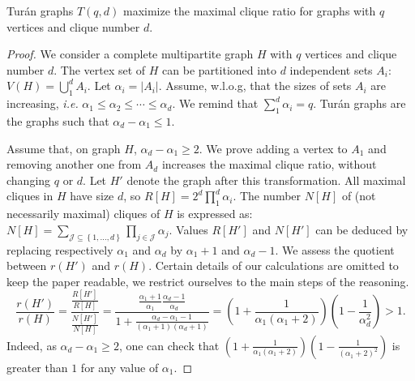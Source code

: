 \documentclass[a4paper,UKenglish,numberwithinsect,cleveref, autoref,anonymous]{lipics-v2021}
\newcommand{\set}[1]{\left\{ #1 \right\}}
\newcommand{\card}[1]{\left| #1 \right|}
\begin{document}
\begin{theorem}
Tur\'an graphs $T(q,d)$ maximize the maximal clique ratio for graphs with $q$ vertices and clique number $d$.
\label{th:turan}
\end{theorem}
\begin{proof}
We consider a complete multipartite graph $H$ with $q$ vertices and clique number $d$. The vertex set of $H$ can be partitioned into $d$ independent sets $A_i$: $V(H) = \bigcup_1^d A_i$. Let $\alpha_i = \card{A_i}$. Assume, w.l.o.g, that the sizes of sets $A_i$ are increasing, {\em i.e.} $\alpha_1 \le \alpha_2 \le \cdots \le \alpha_d$. We remind that $\sum_1^d \alpha_i = q$. Tur\'an graphs are the graphs such that $\alpha_d - \alpha_1 \le 1$.

Assume that, on graph $H$, $\alpha_d - \alpha_1 \ge 2$. We prove adding a vertex to $A_1$ and removing another one from $A_d$ increases the maximal clique ratio, without changing $q$ or $d$. Let $H'$ denote the graph after this transformation. All maximal cliques in $H$ have size $d$, so $R\left[ H\right] = 2^d \prod_1^d \alpha_i$. The number $N\left[ H\right]$ of (not necessarily maximal) cliques of $H$ is expressed as: $N\left[ H\right] = \sum\limits_{\mathcal{J} \subseteq \set{1,\ldots,d}} \prod_{j \in \mathcal{J}} \alpha_j$. Values $R\left[ H'\right]$ and $N\left[ H'\right]$ can be deduced by replacing respectively $\alpha_1$ and $\alpha_d$ by $\alpha_1 + 1$ and $\alpha_d-1$. We assess the quotient between $r(H')$ and $r(H)$. Certain details of our calculations are omitted to keep the paper readable, we restrict ourselves to the main steps of the reasoning. 
\[
\frac{r(H')}{r(H)} = \frac{\frac{R\left[ H'\right]}{R\left[ H\right]}}{\frac{N\left[ H'\right]}{N\left[ H\right]}} = \frac{\frac{\alpha_1+1}{\alpha_1}\frac{\alpha_d-1}{\alpha_d}}{1+\frac{\alpha_d-\alpha_1-1}{(\alpha_1+1)(\alpha_d+1)}} = \left(1+\frac{1}{\alpha_1(\alpha_1+2)}\right)\left(1-\frac{1}{\alpha_d^2}\right) >  1.
\]
Indeed, as $\alpha_d - \alpha_1 \ge 2$, one can check that $\left(1+\frac{1}{\alpha_1(\alpha_1+2)}\right)\left(1-\frac{1}{(\alpha_1+2)^2}\right)$ is greater than $1$ for any value of $\alpha_1$.
\end{proof}
\end{document}
